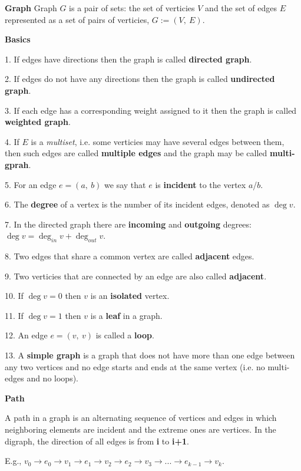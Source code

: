 
\begin{definition}\textbf{Graph}
    Graph $G$ is a pair of sets: the set of verticies $V$ and the set of edges $E$ represented as a set of pairs of verticies, $G := (V,\ E)$.
\end{definition}

\begin{definition}\textbf{Basics}

    1. If edges have directions then the graph is called \textbf{directed graph}.

    2. If edges do not have any directions then the graph is called \textbf{undirected graph}.

    3. If each edge has a corresponding weight assigned to it then the graph is called \textbf{weighted graph}.

    4. If $E$ is a \textit{multiset}, i.e. some verticies may have several edges between them, then such edges are called \textbf{multiple edges} and the graph may be called \textbf{multi-gprah}.

    5. For an edge $e = (a,\ b)$ we say that $e$ is \textbf{incident} to the vertex $a$/$b$.

    6. The \textbf{degree} of a vertex is the number of its incident edges, denoted as $\deg{v}$.

    7. In the directed graph there are \textbf{incoming} and \textbf{outgoing} degrees: $\deg{v} = \deg_{in}{v} + \deg_{out}{v}$.

    8. Two edges that share a common vertex are called \textbf{adjacent} edges.

    9. Two verticies that are connected by an edge are also called \textbf{adjacent}.

    10. If $\deg{v} = 0$ then $v$ is an \textbf{isolated} vertex.

    11. If $\deg{v} = 1$ then $v$ is a \textbf{leaf} in a graph.

    12. An edge $e = (v,\ v)$ is called a \textbf{loop}.

    13. A \textbf{simple graph} is a graph that does not have more than one edge between any two vertices and no edge starts and ends at the same vertex (i.e. no multi-edges and no loops).

\end{definition}

\begin{definition}\textbf{Path}

    A path in a graph is an alternating sequence of vertices and edges in which neighboring elements are incident and the extreme ones are vertices. In the digraph, the direction of all edges is from \textbf{i} to \textbf{i+1}.

    E.g., $v_0 \to e_0 \to v_1 \to e_1 \to v_2 \to e_2 \to v_3 \to ... \to e_{k-1} \to v_k$.

\end{definition}

